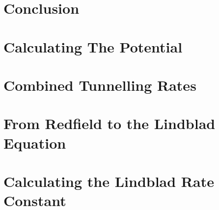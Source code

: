 \documentclass{article}
\begin{document}
\pagebreak

\section{Conclusion}\label{sec:conclusion}


\pagebreak
\printbibliography{}
\pagebreak
\begin{appendix}
    \section{Calculating The Potential}\label{app:interaction potential calculation}
    

    \section{Combined Tunnelling Rates}\label{app:combined tunnelling rates}
    

    \section{From Redfield to the Lindblad Equation}\label{app:redfield to lindblad}
    

    \section{Calculating the Lindblad Rate Constant}\label{app:calculating gamma}
    
\end{appendix}
\end{document}
